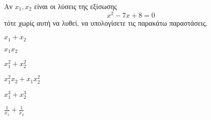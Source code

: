 Αν $ x_1,x_2 $ είναι οι λύσεις της εξίσωσης
\[ x^2-7x+8=0 \]
τότε χωρίς αυτή να λυθεί, να υπολογίσετε τις παρακάτω παραστάσεις.
\begin{multicols}{2}
\begin{alist}
\item $ x_1+x_2 $
\item $ x_1x_2 $
\item $ x_1^2+x_2^2 $
\item $ x_1^2x_2+x_1x_2^2 $
\item $ x_1^3+x_2^3 $
\item $ \frac{1}{x_1}+\frac{1}{x_2} $
\end{alist}
\end{multicols}
